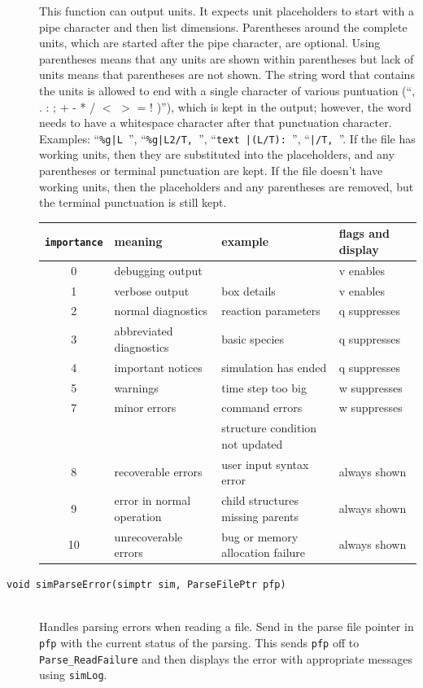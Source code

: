 \documentclass {scrbook}
\newcommand {\ttt} {\texttt}
\begin{document}
\begin{description}
This function can output units. It expects unit placeholders to start with a pipe character and then list dimensions. Parentheses around the complete units, which are started after the pipe character, are optional. Using parentheses means that any units are shown within parentheses but lack of units means that parentheses are not shown. The string word that contains the units is allowed to end with a single character of various puntuation (``, . : ; + - * / $<$ $>$ = ! )''), which is kept in the output; however, the word needs to have a whitespace character after that punctuation character. Examples: ``\ttt{\%g|L }'', ``\ttt{\%g|L2/T, }'', ``\ttt{text |(L/T): }'', ``\ttt{|/T, }''. If the file has working units, then they are substituted into the placeholders, and any parentheses or terminal punctuation are kept. If the file doesn't have working units, then the placeholders and any parentheses are removed, but the terminal punctuation is still kept.

\begin{longtable}[c]{clll}
\ttt{importance} & meaning & example & flags and display\\
\hline
0 & debugging output & & v enables\\
1 & verbose output & box details & v enables\\
2 & normal diagnostics & reaction parameters & q suppresses\\
3 & abbreviated diagnostics & basic species & q suppresses\\
4 & important notices & simulation has ended & q suppresses\\
5 & warnings & time step too big & w suppresses\\
7 & minor errors & command errors & w suppresses\\
 & & structure condition not updated\\
8 & recoverable errors & user input syntax error & always shown\\
9 & error in normal operation & child structures missing parents & always shown\\
10 & unrecoverable errors & bug or memory allocation failure & always shown\\
\end{longtable}

\item[\ttt{void simParseError(simptr sim, ParseFilePtr pfp)}]
\hfill \\
Handles parsing errors when reading a file. Send in the parse file pointer in \ttt{pfp} with the current status of the parsing. This sends \ttt{pfp} off to \ttt{Parse\_ReadFailure} and then displays the error with appropriate messages using \ttt{simLog}.


\end{description}
\end{document}
